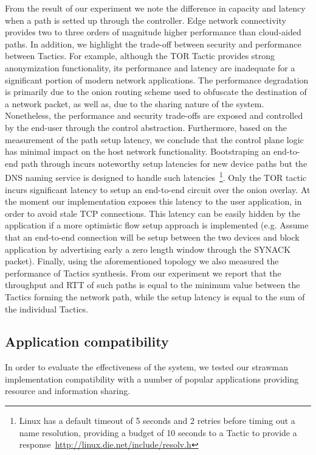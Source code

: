 From the result of our experiment we note the difference in capacity and latency
when a path is setted up through the \signpost controller. Edge network
connectivity provides two to three orders of magnitude higher performance than
cloud-aided paths. In addition, we highlight the trade-off between security and
performance between Tactics. For example, although the TOR Tactic provides
strong anonymization functionality, its performance and latency are inadequate
for a significant portion of modern network applications. The performance
degradation is primarily due to the onion routing scheme used to obfuscate the
destination of a network packet, as well as, due to the sharing nature of the
system.  Nonetheless, the performance and security trade-offs are exposed and
controlled by the end-user through the \signpost control abstraction.
Furthermore, based on the measurement of the path setup latency, we conclude
that the \signpost control plane logic has minimal impact on the host network
functionality. Bootstraping an end-to-end path through \signpost incurs
noteworthy setup latencies for new device paths but the DNS naming service is
designed to handle such latencies~\footnote{Linux has a default timeout of 5
  seconds and 2 retries before timing out a name resolution, providing a budget
  of 10 seconds to a \signpost Tactic to provide a
  response~\url{http://linux.die.net/include/resolv.h}}. Only the TOR tactic
incurs significant latency to setup an end-to-end circuit over the onion
overlay. At the moment our implementation exposes this latency to the user
application, in order to avoid stale TCP connections. This latency can be easily
hidden by the application if a more optimistic flow setup approach is implemented (e.g.
Assume that an end-to-end connection will be setup between the two devices and
block application by advertising early a zero length window through the SYNACK
packet).  Finally, using the aforementioned topology we also measured the
performance of Tactics synthesis.  From our experiment we report that the
throughput and RTT of such paths is equal to the minimum value between the Tactics
forming the network path, while the setup latency is equal to the sum of
the individual Tactics. 

\subsection{Application compatibility}

In order to evaluate the effectiveness of the \signpost system, we tested our
strawman implementation compatibility with a number of popular applications
providing resource and information sharing.

